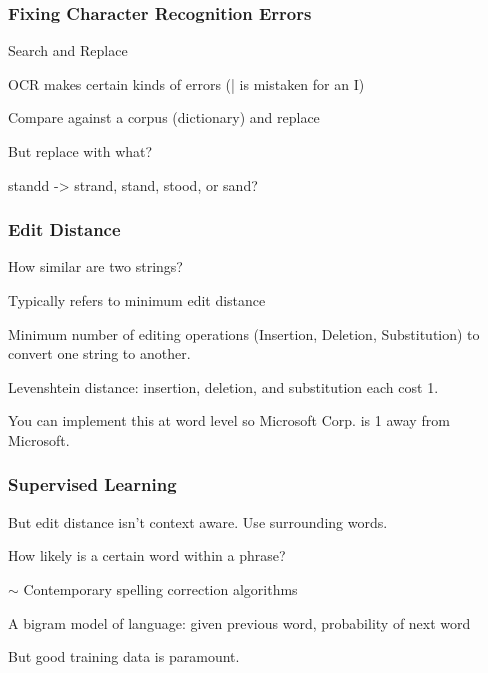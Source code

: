 \documentclass[compress, black]{beamer}
\begin{document}
\begin{frame}
\frametitle{Fixing Character Recognition Errors}
  \begin{large_enum}
    \item[--]<1-> Search and Replace
    \item[--]<2-> OCR makes certain kinds of errors (| is mistaken for an I)
    \item[--]<3-> Compare against a corpus (dictionary) and replace
    \item[--]<4-> But replace with what?
    \item[--]<5-> standd -> strand, stand, stood, or sand?
  \end{large_enum}
\end{frame}

\begin{frame}
  \frametitle{Edit Distance}
  \begin{large_enum}
    \item[--]<1->How similar are two strings?
    \item[--]<2->Typically refers to minimum edit distance
    \item[--]<3->Minimum number of editing operations (Insertion, Deletion, Substitution) to convert one string to another.
    \item[--]<4->Levenshtein distance: insertion, deletion, and substitution each cost 1.
    \item[--]<5->You can implement this at word level so Microsoft Corp. is 1 away from Microsoft.
  \end{large_enum}
\end{frame}

\begin{frame}
\frametitle{Supervised Learning}
  \begin{large_enum}
  \item[--]<1->But edit distance isn't context aware. Use surrounding words.
  \item[--]<2->How likely is a certain word within a phrase?
  \item[--]<3->$\sim$ Contemporary spelling correction algorithms
  \item[--]<4->A bigram model of language: given previous word, probability of next word
  \item[--]<5->But good training data is paramount.
  \end{large_enum}
\end{frame}
\end{document}
